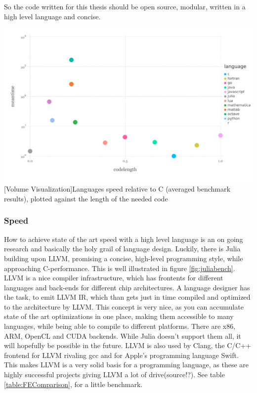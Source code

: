 So the code written for this thesis should be open source, modular, written in a high level language and concise.


\vspace{1em}
\begin{minipage}{\linewidth}
    \centering
    \includegraphics[width=0.9\linewidth]{graphics/julia_bench.pdf}
    [Volume Visualization]{Languages speed relative to C (averaged benchmark results), plotted against the length of the needed code}
    \label{fig:juliabench}
\end{minipage}

\subsubsection{Speed}

How to achieve state of the art speed with a high level language is an on going research and basically the holy grail of language design.
Luckily, there is Julia building upon \ac{LLVM}, promising a concise, high-level programming style, while approaching C-performance. 
This is well illustrated in figure \ref{fig:juliabench}.
\ac{LLVM} is a nice compiler infrastructure, which has frontents for different languages and back-ends for different chip architectures. 
A language designer has the task, to emit \ac{LLVM} \ac{IR}, which than gets just in time compiled and optimized to the architecture by \ac{LLVM}.
This concept is very nice, as you can accumulate state of the art optimizations in one place, making them accessible to many languages, while being able to compile to different platforms. There are x86, ARM, OpenCL and CUDA backends. While Julia doesn't support them all, it will hopefully be possible in the future. 
\ac{LLVM} is also used by Clang, the C/C++ frontend for \ac{LLVM} rivaling gcc and for Apple's programming language Swift. 
This makes \ac{LLVM} is a very solid basis for a programming language, as these are highly successful projects giving  \ac{LLVM} a lot of drive(source!?).
See table \ref{table:FEComparison}, for a little benchmark.

